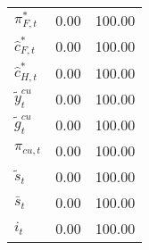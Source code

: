 \begin{center}
\begin{longtable}{lcc}
${\pi_{F,t}^*}        $	 & 	              0.00	 & 	            100.00 \\ 
${\hat c_{F,t}^*}     $	 & 	              0.00	 & 	            100.00 \\ 
${\hat c_{H,t}^*}     $	 & 	              0.00	 & 	            100.00 \\ 
${\tilde y_t^{cu}}    $	 & 	              0.00	 & 	            100.00 \\ 
${\tilde g_t^{cu}}    $	 & 	              0.00	 & 	            100.00 \\ 
${\pi_{cu,t}}         $	 & 	              0.00	 & 	            100.00 \\ 
${\tilde s_t}         $	 & 	              0.00	 & 	            100.00 \\ 
${\bar s_t}           $	 & 	              0.00	 & 	            100.00 \\ 
${i_t}                $	 & 	              0.00	 & 	            100.00 \\ 
\end{longtable}
 \end{center}
